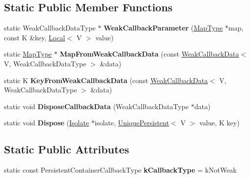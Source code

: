 \subsection*{Static Public Member Functions}
\begin{DoxyCompactItemize}
\item 
\hypertarget{classv8_1_1_default_persistent_value_map_traits_a63b6fc80207ce6ac7d1eaa306b68768c}{}static Weak\+Callback\+Data\+Type $\ast$ {\bfseries Weak\+Callback\+Parameter} (\hyperlink{classv8_1_1_persistent_value_map}{Map\+Type} $\ast$map, const K \&key, \hyperlink{classv8_1_1_local}{Local}$<$ V $>$ value)\label{classv8_1_1_default_persistent_value_map_traits_a63b6fc80207ce6ac7d1eaa306b68768c}

\item 
\hypertarget{classv8_1_1_default_persistent_value_map_traits_a721a7a6624ffe207af1adee6d6be2fe3}{}static \hyperlink{classv8_1_1_persistent_value_map}{Map\+Type} $\ast$ {\bfseries Map\+From\+Weak\+Callback\+Data} (const \hyperlink{classv8_1_1_weak_callback_data}{Weak\+Callback\+Data}$<$ V, Weak\+Callback\+Data\+Type $>$ \&data)\label{classv8_1_1_default_persistent_value_map_traits_a721a7a6624ffe207af1adee6d6be2fe3}

\item 
\hypertarget{classv8_1_1_default_persistent_value_map_traits_ac85c6254f23d246d78a84721a80babae}{}static K {\bfseries Key\+From\+Weak\+Callback\+Data} (const \hyperlink{classv8_1_1_weak_callback_data}{Weak\+Callback\+Data}$<$ V, Weak\+Callback\+Data\+Type $>$ \&data)\label{classv8_1_1_default_persistent_value_map_traits_ac85c6254f23d246d78a84721a80babae}

\item 
\hypertarget{classv8_1_1_default_persistent_value_map_traits_a9e5c3a4a054b13f46065adec2c44ddfe}{}static void {\bfseries Dispose\+Callback\+Data} (Weak\+Callback\+Data\+Type $\ast$data)\label{classv8_1_1_default_persistent_value_map_traits_a9e5c3a4a054b13f46065adec2c44ddfe}

\item 
\hypertarget{classv8_1_1_default_persistent_value_map_traits_ad3c76fc7b1dd8168a69613577e83489d}{}static void {\bfseries Dispose} (\hyperlink{classv8_1_1_isolate}{Isolate} $\ast$isolate, \hyperlink{classv8_1_1_unique_persistent}{Unique\+Persistent}$<$ V $>$ value, K key)\label{classv8_1_1_default_persistent_value_map_traits_ad3c76fc7b1dd8168a69613577e83489d}

\end{DoxyCompactItemize}
\subsection*{Static Public Attributes}
\begin{DoxyCompactItemize}
\item 
\hypertarget{classv8_1_1_default_persistent_value_map_traits_a1f57d8246e4ace68bc9be1047eb7cc40}{}static const Persistent\+Container\+Callback\+Type {\bfseries k\+Callback\+Type} = k\+Not\+Weak\label{classv8_1_1_default_persistent_value_map_traits_a1f57d8246e4ace68bc9be1047eb7cc40}

\end{DoxyCompactItemize}


